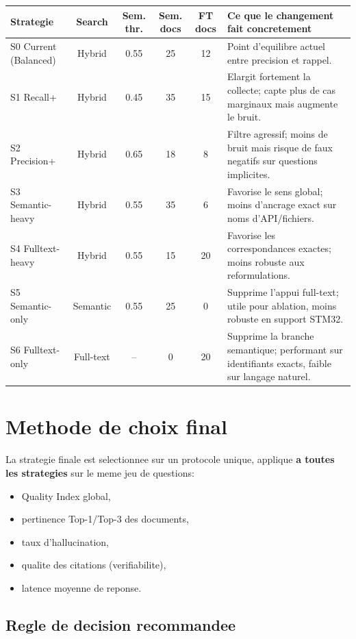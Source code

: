 \documentclass[11pt,a4paper]{article}
\begin{document}
\begin{longtable}{>{\raggedright\arraybackslash}p{3.4cm}c c c c >{\raggedright\arraybackslash}p{5.2cm}}
\toprule
\textbf{Strategie} & \textbf{Search} & \textbf{Sem. thr.} & \textbf{Sem. docs} & \textbf{FT docs} & \textbf{Ce que le changement fait concretement} \\
\midrule
S0 Current (Balanced) & Hybrid & 0.55 & 25 & 12 & Point d'equilibre actuel entre precision et rappel. \\
S1 Recall+ & Hybrid & 0.45 & 35 & 15 & Elargit fortement la collecte; capte plus de cas marginaux mais augmente le bruit. \\
S2 Precision+ & Hybrid & 0.65 & 18 & 8 & Filtre agressif; moins de bruit mais risque de faux negatifs sur questions implicites. \\
S3 Semantic-heavy & Hybrid & 0.55 & 35 & 6 & Favorise le sens global; moins d'ancrage exact sur noms d'API/fichiers. \\
S4 Fulltext-heavy & Hybrid & 0.55 & 15 & 20 & Favorise les correspondances exactes; moins robuste aux reformulations. \\
S5 Semantic-only & Semantic & 0.55 & 25 & 0 & Supprime l'appui full-text; utile pour ablation, moins robuste en support STM32. \\
S6 Fulltext-only & Full-text & -- & 0 & 20 & Supprime la branche semantique; performant sur identifiants exacts, faible sur langage naturel. \\
\bottomrule
\end{longtable}

\section{Methode de choix final}

La strategie finale est selectionnee sur un protocole unique, applique \textbf{a toutes les strategies} sur le meme jeu de questions:
\begin{itemize}
  \item Quality Index global,
  \item pertinence Top-1/Top-3 des documents,
  \item taux d'hallucination,
  \item qualite des citations (verifiabilite),
  \item latence moyenne de reponse.
\end{itemize}

\subsection{Regle de decision recommandee}
\end{document}
